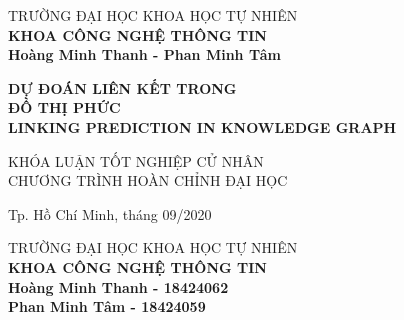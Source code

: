 \begin{titlepage}

\begin{center}
TRƯỜNG ĐẠI HỌC KHOA HỌC TỰ NHIÊN\\
\textbf{KHOA CÔNG NGHỆ THÔNG TIN}\\[2cm]


{ \Large \bfseries Hoàng Minh Thanh - Phan Minh Tâm\\[2cm] } 


{ \Large \bfseries DỰ ĐOÁN LIÊN KẾT TRONG\\ĐỒ THỊ PHỨC\\LINKING PREDICTION IN KNOWLEDGE GRAPH\\[2cm] } 


\large KHÓA LUẬN TỐT NGHIỆP CỬ NHÂN\\
\large CHƯƠNG TRÌNH HOÀN CHỈNH ĐẠI HỌC\\


\vfill
Tp. Hồ Chí Minh, tháng 09/2020

\end{center}

\pagebreak



\begin{center}

TRƯỜNG ĐẠI HỌC KHOA HỌC TỰ NHIÊN\\
\textbf{KHOA CÔNG NGHỆ THÔNG TIN}\\[2cm]


{\large \bfseries Hoàng Minh Thanh - 18424062\\} 
{\large \bfseries Phan Minh Tâm - 18424059\\[2cm]}


\end{center}
\end{titlepage}
